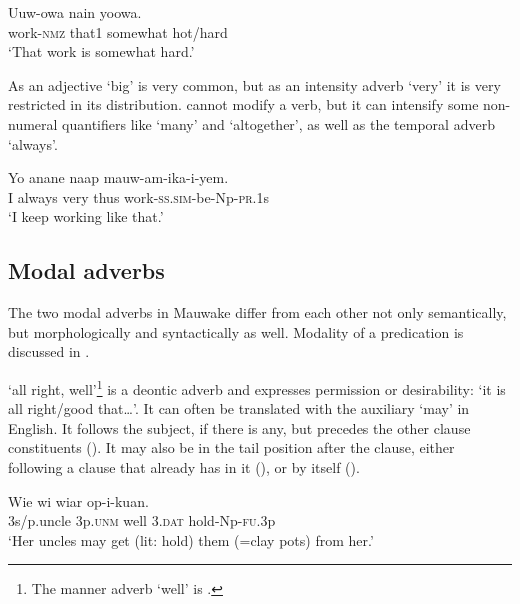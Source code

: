 \ea%
\label{ex:x703}
\gll Uuw-owa nain   yoowa. \\
work-\textsc{nmz} that1 somewhat hot/hard\\
\glt`That work is somewhat hard.'
\z

As an adjective  `big' is very common, but as an intensity adverb `very' it is very restricted in its distribution.  cannot modify a verb, but it can intensify some non-numeral quantifiers like  `many' and  `altogether', as well as the temporal adverb  `always'. 

\ea%
\label{ex:x509}
\gll Yo anane  naap mauw-am-ika-i-yem. \\
I always very thus work-\textsc{ss}.\textsc{sim}-be-Np-\textsc{pr}.1s\\
\glt`I  keep working like that.'
\z

\subsection{Modal adverbs}
{}
The two modal adverbs in Mauwake differ from each other not only semantically, but morphologically and syntactically as well. Modality of a predication is discussed in .

 `all right, well'\footnote{The manner adverb `well' is .} is a deontic adverb and expresses permission or desirability: `it is all right/good that{\dots}'. It can often be translated with the auxiliary `may' in English. It follows the subject, if there is any, but precedes the other clause constituents (). It may also be in the tail position after the clause, either following a clause that already has  in it (), or by itself (). 

\ea%
\label{ex:x514}
\gll Wie wi  wiar op-i-kuan. \\
3s/p.uncle 3p.\textsc{unm} well 3.\textsc{dat} hold-Np-\textsc{fu}.3p\\
\glt`Her uncles may get (lit: hold) them (=clay pots) from her.' 
\z

